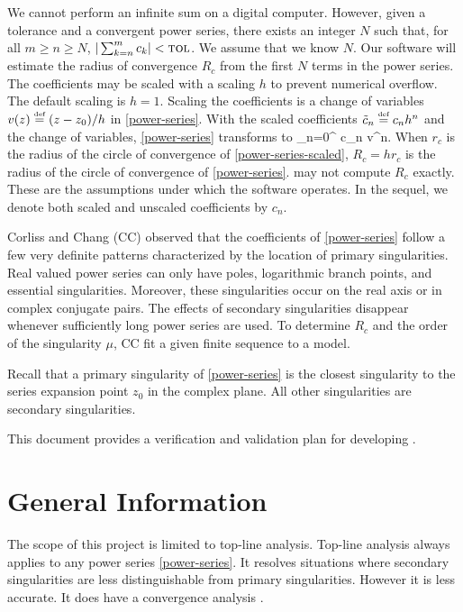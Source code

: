 \documentclass[12pt, titlepage]{article}
\begin{document}
We cannot perform an infinite sum on a digital computer. However, given a tolerance \tol
and a convergent power series, there exists an integer $N$ such that, for all
$m \geq n \geq N$, $| \sum_{k=n}^{m} c_k | < \text{\sc tol}$. We assume that we know $N$. Our software
 will estimate the radius of convergence $R_c$ from the first $N$ terms 
in the power series. The coefficients may be scaled with a scaling $h$ to
prevent numerical overflow. The default scaling is $h=1$. Scaling the coefficients
is a change of variables $v(z) \stackrel{\textup{\tiny def}}{=} (z - z_0)/h$ in \eqref{power-series}. With the scaled coefficients
 $\tilde c_n \stackrel{\textup{\tiny def}}{=} c_n h^n$ and the change of variables, \eqref{power-series} transforms to
\EQ
{
  \label{eq:power-series-scaled}
  \sum_{n=0}^{\infty} \tilde c_n v^n.
}
When $r_c$ is the radius of the circle of convergence of \eqref{power-series-scaled}, $R_c = h r_c$
is the radius of the circle of convergence of \eqref{power-series}.
 may not compute $R_c$ exactly. These are the assumptions under which the  software
operates. In the sequel, we denote both scaled and unscaled coefficients by $c_n$.

Corliss and Chang \cite{chang1982} (CC) observed that the coefficients of \eqref{power-series} follow a few
very definite patterns characterized by the location of primary singularities. Real valued power series
can only have poles, logarithmic branch points, and essential singularities. Moreover, these singularities
occur on the real axis or in complex conjugate pairs. The effects of secondary singularities disappear
whenever sufficiently long power series are used. To determine $R_c$ and the order of the singularity $\mu$,
CC fit a given finite sequence to a model.

Recall that a primary singularity of \eqref{power-series} is the closest singularity to the series
expansion point $z_0$ in the complex plane. All other singularities are secondary singularities.

This document provides a verification and validation plan for developing .

\section{General Information}

The scope of this  project is limited to top-line analysis.
Top-line analysis always applies to any power series \eqref{power-series}. It resolves situations
where secondary singularities are less distinguishable from primary singularities. However it is
less accurate. It does have a convergence analysis \cite{chang1982}.
\end{document}

